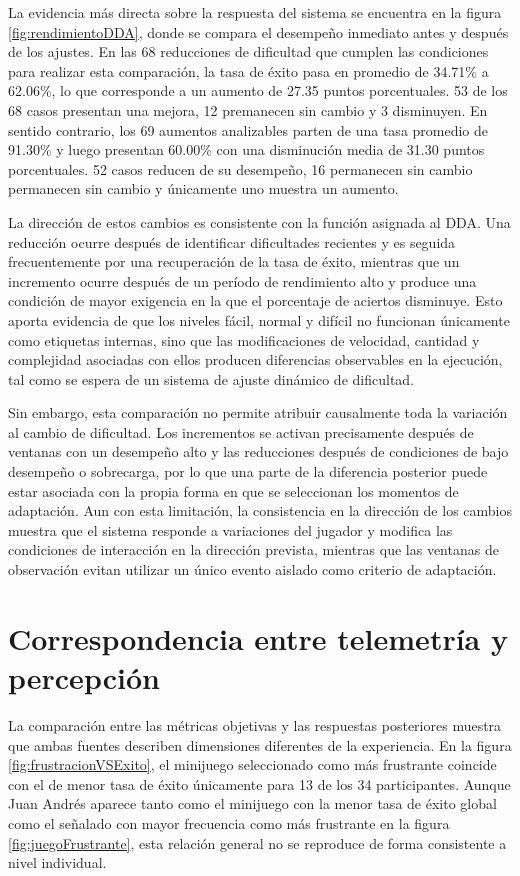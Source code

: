 La evidencia más directa sobre la respuesta del sistema se encuentra en 
la figura \ref{fig:rendimientoDDA}, donde se compara el desempeño
inmediato antes y después de los ajustes. En las 68 reducciones de dificultad
que cumplen las condiciones para realizar esta comparación, la tasa de
éxito pasa en promedio de 34.71\% a 62.06\%, lo que corresponde a un aumento de 27.35
puntos porcentuales. 53 de los 68 casos presentan una mejora, 12 premanecen
sin cambio y 3 disminuyen. En sentido contrario, los 69 aumentos analizables
parten de una tasa promedio de 91.30\% y luego presentan 60.00\% con una disminución 
media de 31.30 puntos porcentuales. 52 casos reducen de su desempeño, 16 permanecen sin cambio
permanecen sin cambio y únicamente uno muestra un aumento.

La dirección de estos cambios es consistente con la función asignada al 
DDA. Una reducción ocurre después de identificar dificultades recientes 
y es seguida frecuentemente por una recuperación de la tasa de éxito, 
mientras que un incremento ocurre después de un período de rendimiento 
alto y produce una condición de mayor exigencia en la que el porcentaje 
de aciertos disminuye. Esto aporta evidencia de que los niveles fácil, 
normal y difícil no funcionan únicamente como etiquetas internas, 
sino que las modificaciones de velocidad, cantidad y complejidad 
asociadas con ellos producen diferencias observables en la ejecución, 
tal como se espera de un sistema de ajuste dinámico de dificultad.

Sin embargo, esta comparación no permite atribuir causalmente toda la 
variación al cambio de dificultad. Los incrementos se activan 
precisamente después de ventanas con un desempeño alto y las reducciones 
después de condiciones de bajo desempeño o sobrecarga, por lo que una 
parte de la diferencia posterior puede estar asociada con la propia 
forma en que se seleccionan los momentos de adaptación. Aun con esta 
limitación, la consistencia en la dirección de los cambios muestra que el 
sistema responde a variaciones del jugador y modifica las condiciones de 
interacción en la dirección prevista, mientras que las ventanas de 
observación evitan utilizar un único evento aislado como criterio de 
adaptación.

\section{Correspondencia entre telemetría y percepción}
La comparación entre las métricas objetivas y las respuestas posteriores 
muestra que ambas fuentes describen dimensiones diferentes de la 
experiencia. En la figura \ref{fig:frustracionVSExito}, el minijuego 
seleccionado como más frustrante coincide con el de menor tasa de éxito 
únicamente para 13 de los 34 participantes. Aunque Juan Andrés aparece 
tanto como el minijuego con la menor tasa de éxito global como el 
señalado con mayor frecuencia como más frustrante en la figura
\ref{fig:juegoFrustrante}, esta relación general no se reproduce de forma
consistente a nivel individual.

